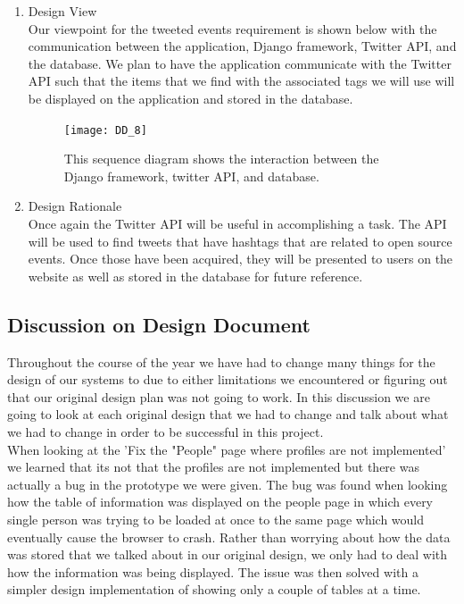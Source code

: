 \documentclass[draftclsnofoot,10pt,onecolumn]{IEEEtran} %
\begin{document}
\begin{enumerate}
\begin{enumerate}
\begin{enumerate}
				\item Design View \\ %
				Our viewpoint for the tweeted events requirement is shown below with the communication between the
				application, Django framework, Twitter API, and the database. We plan to have the application
				communicate with the Twitter
				API such that the items that we find with the associated tags we will use will be displayed on the
				application and stored in the database. \\
				
				\begin{figure}[H]
  					\begin{center}
						\texttt{[image: DD\_8]}
						\captionsetup{width=.4\linewidth}
						\centering
  						\caption{This sequence diagram shows the interaction between the Django framework, twitter API, 
  						and database.}
  					\end{center}
				\end{figure}
				
				\item Design Rationale \\
				Once again the Twitter API will be useful in accomplishing a task. The API will be used to find tweets that
				have hashtags that are related to open source events. Once those have been acquired, they will be presented
				to users on the website as well as stored in the database for future reference. \\
			\end{enumerate}
	\end{enumerate}
\end{enumerate}

\subsection{Discussion on Design Document}
Throughout the course of the year we have had to change many things for the design of our systems to due to either limitations we encountered or figuring out that our original design plan was not going to work. In this discussion we are going to look at each original design that we had to change and talk about what we had to change in order to be successful in this project.\\

When looking at the 'Fix the "People" page where profiles are not implemented' we learned that its not that the profiles are not implemented but there was actually a bug in the prototype we were given. The bug was found when looking how the table of information was displayed on the people page in which every single person was trying to be loaded at once to the same page which would eventually cause the browser to crash. Rather than worrying about how the data was stored that we talked about in our original design, we only had to deal with how the information was being displayed. The issue was then solved with a simpler design implementation of showing only a couple of tables at a time. \\
\end{document}
